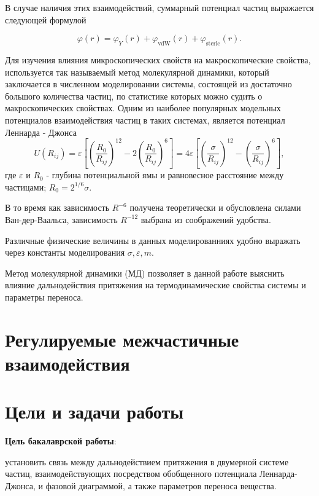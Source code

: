 В случае наличия этих взаимодействий, суммарный потенциал частиц выражается следующей формулой

\begin{equation}
\varphi(r)=\varphi_{Y}(r)+\varphi_{\mathrm{vdW}}(r)+\varphi_{\mathrm{steric}}(r).
\end{equation}

Для изучения влияния микроскопических свойств на макроскопические свойства, используется так называемый метод молекулярной динамики, который заключается в численном моделировании системы, состоящей из достаточно большого количества частиц, по статистике которых можно судить о макроскопических свойствах. Одним из наиболее популярных модельных потенциалов взаимодействия частиц в таких системах, является потенциал Леннарда - Джонса
\begin{equation}
U\left(R_{i j}\right)=\varepsilon\left[\left(\frac{R_{0}}{R_{i j}}\right)^{12}-2\left(\frac{R_{0}}{R_{i j}}\right)^{6}\right]=4 \varepsilon\left[\left(\frac{\sigma}{R_{i j}}\right)^{12}-\left(\frac{\sigma}{R_{i j}}\right)^{6}\right],
\label{eqFullLJ}
\end{equation}
где $\varepsilon$ и $R_0$ - глубина потенциальной ямы и равновесное расстояние между частицами; $R_0 = 2^{1/6}\sigma$.

В то время как зависимость $R^{-6}$ получена теоретически и обусловлена силами Ван-дер-Ваальса, зависимость $R^{-12}$ выбрана из соображений удобства.

Различные физические величины в данных моделированниях удобно выражать через константы моделирования $\sigma, \varepsilon, m$.

Метод молекулярной динамики (МД) позволяет в данной работе выяснить влияние дальнодействия притяжения на термодинамические свойства системы и параметры переноса.

\section{Регулируемые межчастичные взаимодействия}\label{C1_2}



\section{Цели и задачи работы}

\textbf{Цель бакалаврской работы}:

установить связь между дальнодействием притяжения в двумерной системе частиц, взаимодействующих посредством обобщенного потенциала Леннарда-Джонса, и фазовой диаграммой, а также параметров переноса вещества.
